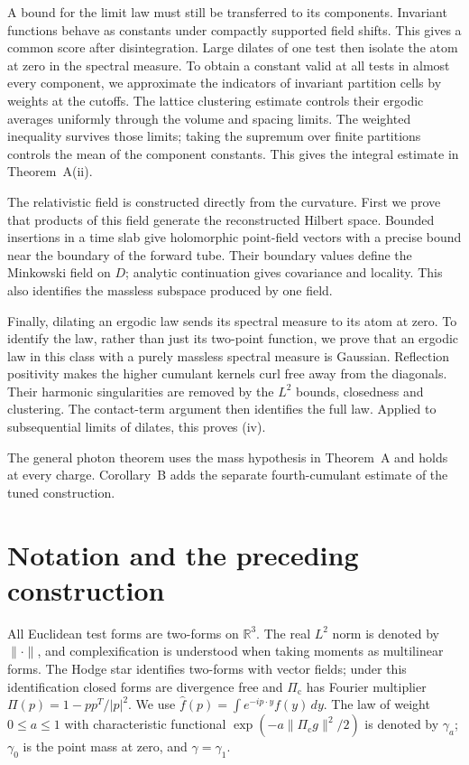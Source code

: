 \documentclass[11pt]{amsart}
\theoremstyle{definition}
\begin{document}
A bound for the limit law must still be transferred to its components.
Invariant functions behave as constants under compactly supported
field shifts. This gives a common score after disintegration. Large
dilates of one test then isolate the atom at zero in the spectral measure.
To obtain a constant valid at all tests in almost every component, we
approximate the indicators of invariant partition cells by weights at
the cutoffs. The lattice clustering estimate controls their ergodic
averages uniformly through the volume and spacing limits. The weighted
inequality survives those limits; taking the supremum over finite
partitions controls the mean of the component constants. This gives
the integral estimate in Theorem~A(ii).

The relativistic field is constructed directly from the curvature.
First we prove that products of this field generate the reconstructed
Hilbert space. Bounded insertions in a time slab give holomorphic
point-field vectors with a precise bound near the boundary of the
forward tube. Their boundary values define the Minkowski field on
$D$; analytic continuation gives covariance and locality. This also
identifies the massless subspace produced by one field.

Finally, dilating an ergodic law sends its spectral measure to its atom
at zero. To identify the law, rather than just its two-point function,
we prove that an ergodic law in this class with a purely massless
spectral measure is Gaussian. Reflection positivity makes the higher
cumulant kernels curl free away from the diagonals. Their harmonic
singularities are removed by the $L^2$ bounds, closedness and clustering.
The contact-term argument then identifies the full law. Applied to
subsequential limits of dilates, this proves (iv).

The general photon theorem uses the mass hypothesis in Theorem~A and
holds at every charge. Corollary~B adds the separate fourth-cumulant
estimate of the tuned construction.


\tableofcontents

\section*{Notation and the preceding construction}
All Euclidean test forms are two-forms on $\mathbb R^3$.
The real $L^2$ norm is denoted by $\|\cdot\|$, and complexification is
understood when taking moments as multilinear forms.
The Hodge star identifies two-forms with vector fields; under this
identification closed forms are divergence free and
$\Pi_{\mathrm c}$ has Fourier multiplier $\Pi(p)=1-pp^T/|p|^2$.
We use $\hat f(p)=\int e^{-ip\cdot y}f(y)\,dy$.
The law of weight $0\le a\le1$ with characteristic functional
$\exp(-a\|\Pi_{\mathrm c}g\|^2/2)$ is denoted by $\gamma_a$;
$\gamma_0$ is the point mass at zero, and $\gamma=\gamma_1$.
\end{document}
